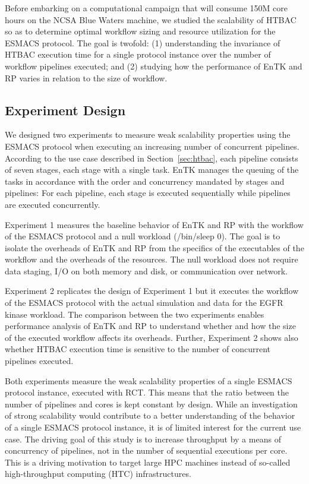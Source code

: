 \documentclass{bmcart}
\begin{document}
Before embarking on a computational campaign that will consume 150M core
hours on the NCSA Blue Waters machine, we studied the scalability of HTBAC so
as to determine optimal workflow sizing and resource utilization for the
ESMACS protocol. The goal is twofold: (1) understanding the invariance of HTBAC execution time for a single protocol instance over the number of workflow pipelines executed; and (2) studying how the performance of EnTK and RP varies 
in relation to the size of workflow.

\subsection{Experiment Design}\label{ssec:exp_design}

We designed two experiments to measure weak scalability properties using the 
ESMACS protocol when executing an increasing number of concurrent pipelines. According to the use case described in Section~\ref{sec:htbac}, each pipeline consists of seven stages, each stage with a single task. EnTK manages the queuing of the tasks in accordance with the order and concurrency mandated by stages and
pipelines: For each pipeline, each stage is executed sequentially while
pipelines are executed concurrently.

Experiment 1 measures the baseline behavior of EnTK and RP with the workflow
of the ESMACS protocol and a null workload (\textmd{/bin/sleep 0}). The goal
is to isolate the overheads of EnTK and RP from the specifics of the
executables of the workflow and the overheads of the resources. The null
workload does not require data staging, I/O on both memory and disk, or
communication over network.

Experiment 2 replicates the design of Experiment 1 but it executes the
workflow of the ESMACS protocol with the actual simulation and data for the
EGFR kinase workload. The comparison between the two experiments enables
performance analysis of EnTK and RP to understand whether and how the size of
the executed workflow affects its overheads. Further, Experiment 2 shows also
whether HTBAC execution time is sensitive to the number of concurrent
pipelines executed.

Both experiments measure the weak scalability properties of a single ESMACS protocol instance, executed with RCT\@. This
means that the ratio between the number of pipelines and cores is kept
constant by design. While an investigation of strong scalability would
contribute to a better understanding of the behavior of a single ESMACS protocol
instance,
it is of limited interest for the current use case. The driving goal of this 
study is to increase throughput by a means of concurrency of pipelines, not in the
number of sequential executions per core. This is a driving motivation to
target large HPC machines instead of so-called high-throughput computing (HTC) 
infrastructures.
\end{document}
